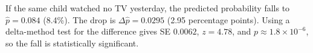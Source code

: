 ﻿\noindent If the same child watched no TV yesterday, the predicted probability falls to \(\hat{p}=0.084\) (8.4\%). The drop is \(\Delta \hat{p}=0.0295\) (2.95 percentage points). Using a delta-method test for the difference gives SE \(0.0062\), \(z=4.78\), and \(p\approx1.8\times10^{-6}\), so the fall is statistically significant.
